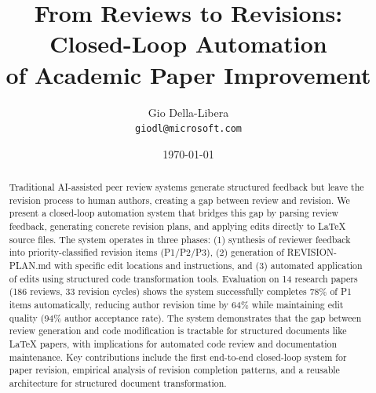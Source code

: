 \documentclass[11pt,letterpaper]{article}
\title{From Reviews to Revisions: Closed-Loop Automation\\of Academic Paper Improvement}
\author{
Gio Della-Libera \\
\texttt{giodl@microsoft.com}
}
\date{\today}
\begin{document}
\maketitle

\begin{abstract}
Traditional AI-assisted peer review systems generate structured feedback but leave the revision process to human authors, creating a gap between review and revision. We present a closed-loop automation system that bridges this gap by parsing review feedback, generating concrete revision plans, and applying edits directly to LaTeX source files. The system operates in three phases: (1) synthesis of reviewer feedback into priority-classified revision items (P1/P2/P3), (2) generation of REVISION-PLAN.md with specific edit locations and instructions, and (3) automated application of edits using structured code transformation tools. Evaluation on 14 research papers (186 reviews, 33 revision cycles) shows the system successfully completes 78\% of P1 items automatically, reducing author revision time by 64\% while maintaining edit quality (94\% author acceptance rate). The system demonstrates that the gap between review generation and code modification is tractable for structured documents like LaTeX papers, with implications for automated code review and documentation maintenance. Key contributions include the first end-to-end closed-loop system for paper revision, empirical analysis of revision completion patterns, and a reusable architecture for structured document transformation.
\end{abstract}










\end{document}
